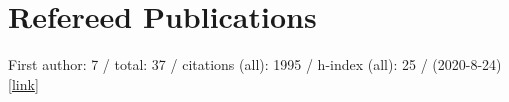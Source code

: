 \section*{Refereed Publications}

First author: 7 / total: 37 / citations (all): 1995 / h-index (all): 25 / (2020-8-24) [\href{https://ui.adsabs.harvard.edu/#/public-libraries/G0Ow9TGTRyuVT7hbhzailA}{link}]
